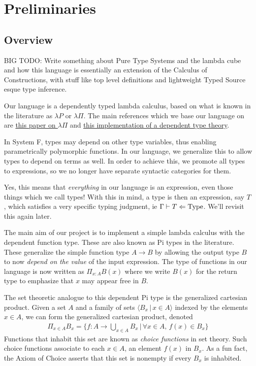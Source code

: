 \documentclass{article}
\begin{document}
\section{Preliminaries}
\subsection{Overview}

BIG TODO: Write something about Pure Type Systems and the lambda cube and how
this language is essentially an extension of the Calculus of Constructions, with
stuff like top level definitions and lightweight Typed Source esque type
inference.

Our language is a dependently typed lambda calculus, based on what is known in
the literature as $\lambda P$ or $\lambda \Pi$.
The main references which we base our language on are
\href{https://www.andres-loeh.de/LambdaPi/LambdaPi.pdf}{this paper on $\lambda
  \Pi$} and \href{https://github.com/andrejbauer/spartan-type-theory}{this
  implementation of a dependent type theory}.

In System F, types may depend on other type variables, thus enabling
parametrically polymorphic functions. 
In our language, we generalize this to allow types to depend on terms as well.
In order to achieve this, we promote all types to expressions, so we no longer
have separate syntactic categories for them. 

Yes, this means that \textit{everything} in our language is an expression, even those
things which we call types!
With this in mind, a type is then an expression, say $T$, which satisfies a very
specific typing judgment, ie $\Gamma \vdash T \Leftarrow \operatorname{Type}$. We'll revisit
this again later.

The main aim of our project is to implement a simple lambda calculus with the
dependent function type. These are also known as Pi types in the literature.
These generalize the simple function type $A \to B$ by allowing the output type
$B$ to now \textit{depend on the value} of the input expression.
The type of functions in our language is now written as $\Pi_{x : A} B(x)$ where
we write $B(x)$ for the return type to emphasize that $x$ may appear free in
$B$.

The set theoretic analogue to this dependent Pi type is the generalized
cartesian product. Given a set $A$ and a family of sets $\langle B_x \, | \, x
\in A\rangle$ indexed by the
elements $x \in A$, we can form the generalized cartesian product, denoted
\begin{align*}
  \Pi_{x \in A} B_x = \bigg\{ f : A \rightarrow \bigcup_{x \in A} B_x \, | \, \forall x \in A, \, f(x) \in B_x \bigg\}
\end{align*}
Functions that inhabit this set are known as \textit{choice functions} in set
theory. Such choice functions associate to each $x \in A$, an element $f(x)$ in $B_x$.
As a fun fact, the Axiom of Choice asserts that this set is nonempty
if every $B_x$ is inhabited.
\end{document}

